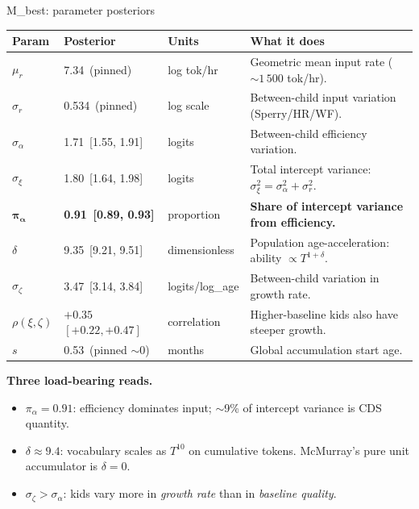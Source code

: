 \begin{frame}{M\_best: parameter posteriors}

\centering
\scriptsize
\renewcommand{\arraystretch}{1.20}
\begin{tabular}{@{}llp{1.7cm}p{6.7cm}@{}}
\toprule
\textbf{Param} & \textbf{Posterior} & \textbf{Units} & \textbf{What it does} \\
\midrule
$\mu_r$           & 7.34 \,(pinned)            & log tok/hr      & Geometric mean input rate ($\sim 1\,500$ tok/hr). \\
$\sigma_r$        & 0.534 \,(pinned)           & log scale       & Between-child input variation \,(Sperry/HR/WF). \\
$\sigma_\alpha$   & 1.71 \,[1.55, 1.91]        & logits          & Between-child efficiency variation. \\
$\sigma_\xi$      & 1.80 \,[1.64, 1.98]        & logits          & Total intercept variance: $\sigma_\xi^2 = \sigma_\alpha^2 + \sigma_r^2$. \\
$\boldsymbol{\pi_\alpha}$ & \textbf{0.91 \,[0.89, 0.93]} & proportion & \textbf{Share of intercept variance from efficiency.} \\
$\delta$          & 9.35 \,[9.21, 9.51]        & dimensionless   & Population age-acceleration: ability $\propto T^{1+\delta}$. \\
$\sigma_\zeta$    & 3.47 \,[3.14, 3.84]        & logits/log\_age & Between-child variation in growth rate. \\
$\rho(\xi,\zeta)$ & $+0.35$ \,$[+0.22, +0.47]$ & correlation     & Higher-baseline kids also have steeper growth. \\
$s$               & 0.53 \,(pinned $\sim 0$)   & months          & Global accumulation start age. \\
\bottomrule
\end{tabular}

\vspace{0.6em}

\scriptsize
\textbf{Three load-bearing reads.}
\begin{itemize}\setlength\itemsep{0.15em}
\item $\pi_\alpha = 0.91$: efficiency dominates input; $\sim$9\% of
  intercept variance is CDS quantity.
\item $\delta \approx 9.4$: vocabulary scales as $T^{10}$ on cumulative
  tokens. McMurray's pure unit accumulator is $\delta = 0$.
\item $\sigma_\zeta > \sigma_\alpha$: kids vary more in
  \emph{growth rate} than in \emph{baseline quality}.
\end{itemize}

\end{frame}

